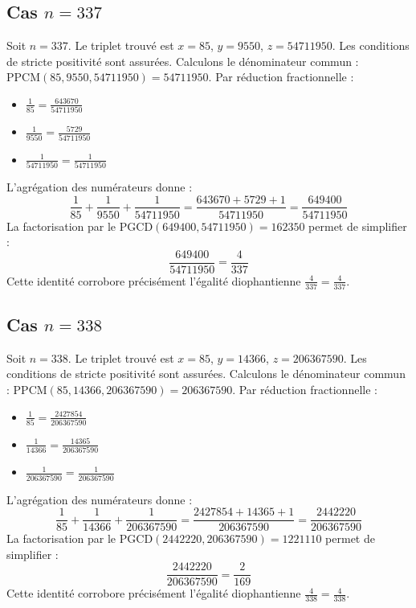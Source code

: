 \documentclass[11pt,a4paper]{article}
\begin{document}
\subsection{Cas $n = 337$}
Soit $n = 337$. Le triplet trouvé est $x = 85$, $y = 9550$, $z = 54711950$.
Les conditions de stricte positivité sont assurées.
Calculons le dénominateur commun : $\text{PPCM}(85, 9550, 54711950) = 54711950$.
Par réduction fractionnelle :
\begin{itemize}
    \item $\frac{1}{85} = \frac{643670}{54711950}$
    \item $\frac{1}{9550} = \frac{5729}{54711950}$
    \item $\frac{1}{54711950} = \frac{1}{54711950}$
\end{itemize}
L'agrégation des numérateurs donne :
$$ \frac{1}{85} + \frac{1}{9550} + \frac{1}{54711950} = \frac{643670 + 5729 + 1}{54711950} = \frac{649400}{54711950} $$
La factorisation par le $\text{PGCD}(649400, 54711950) = 162350$ permet de simplifier :
$$ \frac{649400}{54711950} = \frac{4}{337} $$
Cette identité corrobore précisément l'égalité diophantienne $\frac{4}{337} = \frac{4}{337}$.

\subsection{Cas $n = 338$}
Soit $n = 338$. Le triplet trouvé est $x = 85$, $y = 14366$, $z = 206367590$.
Les conditions de stricte positivité sont assurées.
Calculons le dénominateur commun : $\text{PPCM}(85, 14366, 206367590) = 206367590$.
Par réduction fractionnelle :
\begin{itemize}
    \item $\frac{1}{85} = \frac{2427854}{206367590}$
    \item $\frac{1}{14366} = \frac{14365}{206367590}$
    \item $\frac{1}{206367590} = \frac{1}{206367590}$
\end{itemize}
L'agrégation des numérateurs donne :
$$ \frac{1}{85} + \frac{1}{14366} + \frac{1}{206367590} = \frac{2427854 + 14365 + 1}{206367590} = \frac{2442220}{206367590} $$
La factorisation par le $\text{PGCD}(2442220, 206367590) = 1221110$ permet de simplifier :
$$ \frac{2442220}{206367590} = \frac{2}{169} $$
Cette identité corrobore précisément l'égalité diophantienne $\frac{4}{338} = \frac{4}{338}$.
\end{document}

